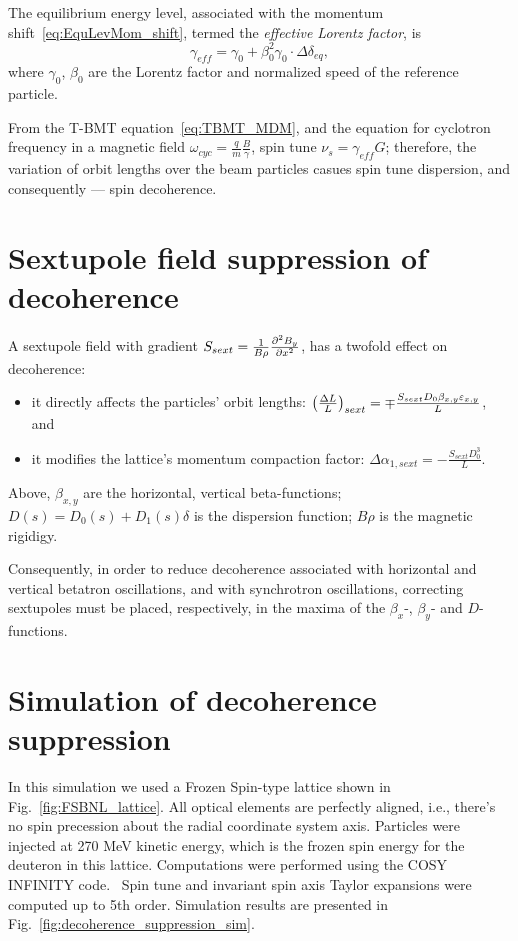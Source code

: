 \documentclass[a4paper]{jacow}
\newcommand{\w}{\omega}
\begin{document}
The equilibrium energy level, associated with the momentum shift~\eqref{eq:EquLevMom_shift},
termed the \emph{effective Lorentz factor}, is\cite{Senichev:2017amn}
\begin{equation}\label{eq:EffectiveGamma}
\gamma_{eff} = \gamma_0 + \beta_0^2\gamma_0\cdot\Delta\delta_{eq},
\end{equation}
where $\gamma_0$, $\beta_0$ are the Lorentz factor and normalized speed of the reference particle.

From the T-BMT equation~\eqref{eq:TBMT_MDM}, and the equation for cyclotron frequency in a magnetic field
$\w_{cyc} = \frac qm \frac B\gamma$, spin tune $\nu_s = \gamma_{eff}G$; therefore, the variation of
orbit lengths over the beam particles casues spin tune dispersion, and consequently --- spin decoherence.

\section{Sextupole field suppression of decoherence}
A sextupole field with gradient $ S_{sext} = \frac{1}{B\rho} \pddx{B_y}[x][2]$, has a twofold effect
on decoherence:
\begin{itemize}
\item it directly affects the particles' orbit lengths:
  $\bkt{\frac{\Delta L}{L}}_{sext} = \mp \frac{S_{sext}D_0\beta_{x,y}\varepsilon_{x,y}}{L}$, and
\item it modifies the lattice's momentum compaction factor: $\Delta \alpha_{1,sext} = -\frac{S_{sext}D_0^3}{L}$.
\end{itemize}
Above, $\beta_{x,y}$ are the horizontal, vertical beta-functions;
$D(s) = D_0(s) + D_1(s)\delta$ is the dispersion function; $B\rho$ is the magnetic rigidigy.

Consequently, in order to reduce decoherence associated with horizontal and vertical betatron oscillations,
and with synchrotron oscillations, correcting sextupoles must be placed, respectively, in the maxima of
the $\beta_x$-, $\beta_y$- and $D$-functions.
\section{Simulation of decoherence suppression}
In this simulation we used a Frozen Spin-type lattice shown in Fig.~\ref{fig:FSBNL_lattice}.
All optical elements are perfectly aligned, i.e., there's no spin precession about the
radial coordinate system axis. Particles were injected at 270 MeV kinetic energy, which is the
frozen spin energy for the deuteron in this lattice. Computations were performed using the
COSY INFINITY code.~\cite{COSY:Website} Spin tune and invariant spin axis Taylor expansions
were computed up to 5th order. Simulation results are presented in Fig.~\ref{fig:decoherence_suppression_sim}.
\end{document}
